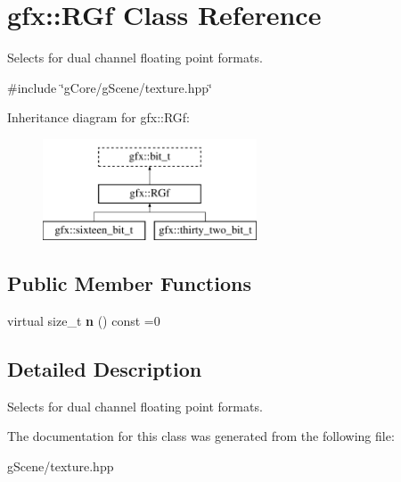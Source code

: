 \hypertarget{classgfx_1_1RGf}{\section{gfx\-:\-:R\-Gf Class Reference}
\label{classgfx_1_1RGf}
}


Selects for dual channel floating point formats.  




{\ttfamily \#include \char`\"{}g\-Core/g\-Scene/texture.\-hpp\char`\"{}}

Inheritance diagram for gfx\-:\-:R\-Gf\-:\begin{figure}[H]
\begin{center}
\leavevmode
\includegraphics[height=3.000000cm]{classgfx_1_1RGf}
\end{center}
\end{figure}
\subsection*{Public Member Functions}
\begin{DoxyCompactItemize}
\item 
\hypertarget{classgfx_1_1RGf_a24e5102b767a74ccb5efcf164ba1ccb1}{virtual size\-\_\-t {\bfseries n} () const =0}\label{classgfx_1_1RGf_a24e5102b767a74ccb5efcf164ba1ccb1}

\end{DoxyCompactItemize}


\subsection{Detailed Description}
Selects for dual channel floating point formats. 

The documentation for this class was generated from the following file\-:\begin{DoxyCompactItemize}
\item 
g\-Scene/texture.\-hpp\end{DoxyCompactItemize}
